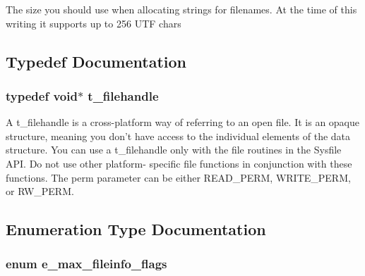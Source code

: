 The size you should use when allocating strings for filenames. At the time of this writing it supports up to 256 UTF chars 

\subsection{Typedef Documentation}
\hypertarget{group__files_gafcb776aa74d514754e83b30995b5a5d1}{
\subsubsection[{t\_\-filehandle}]{\setlength{\rightskip}{0pt plus 5cm}typedef void$\ast$ {\bf t\_\-filehandle}}}
\label{group__files_gafcb776aa74d514754e83b30995b5a5d1}


A t\_\-filehandle is a cross-\/platform way of referring to an open file. It is an opaque structure, meaning you don’t have access to the individual elements of the data structure. You can use a t\_\-filehandle only with the file routines in the Sysfile API. Do not use other platform-\/ specific file functions in conjunction with these functions. The perm parameter can be either READ\_\-PERM, WRITE\_\-PERM, or RW\_\-PERM. 

\subsection{Enumeration Type Documentation}
\hypertarget{group__files_gaad4b197d6bb36cf68616a756fa85f1be}{
\subsubsection[{e\_\-max\_\-fileinfo\_\-flags}]{\setlength{\rightskip}{0pt plus 5cm}enum {\bf e\_\-max\_\-fileinfo\_\-flags}}}
\label{group__files_gaad4b197d6bb36cf68616a756fa85f1be}


